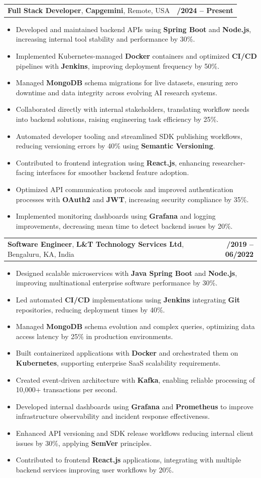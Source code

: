 \documentclass[letterpaper,11pt]{article}
\makeatletter
\newcommand{\resumeItem}[1]{
  \item\footnotesize{
    {#1 \vspace{-2pt}}
  }
}
\newcommand{\resumeSubheading}[4]{
  \vspace{-2pt}\item
    \begin{tabular*}{1.0\textwidth}[t]{l@{\extracolsep{\fill}}r}
      \textbf{\fontsize{10pt}{14pt}\selectfont #3}, \textbf{\fontsize{10pt}{14pt}\selectfont #1}, \fontsize{10pt}{14pt}\selectfont #4 & \textbf{\fontsize{10pt}{14pt}\selectfont #2} \\
    \end{tabular*}\vspace{-7pt}
}
\newcommand{\resumeItemListStart}{\begin{itemize}[leftmargin=*]}
\newcommand{\resumeItemListEnd}{\end{itemize}\vspace{-5pt}}
\makeatother
\begin{document}
    \resumeSubheading
        {Capgemini}{01/2024 -- Present}
        {Full Stack Developer}{Remote, USA}
      \resumeItemListStart
        \resumeItem{Developed and maintained backend APIs using \textbf{Spring Boot} and \textbf{Node.js}, increasing internal tool stability and performance by 30\%.}
        \resumeItem{Implemented Kubernetes-managed \textbf{Docker} containers and optimized \textbf{CI/CD} pipelines with \textbf{Jenkins}, improving deployment frequency by 50\%.}
        \resumeItem{Managed \textbf{MongoDB} schema migrations for live datasets, ensuring zero downtime and data integrity across evolving AI research systems.}
        \resumeItem{Collaborated directly with internal stakeholders, translating workflow needs into backend solutions, raising engineering task efficiency by 25\%.}
        \resumeItem{Automated developer tooling and streamlined SDK publishing workflows, reducing versioning errors by 40\% using \textbf{Semantic Versioning}.}
        \resumeItem{Contributed to frontend integration using \textbf{React.js}, enhancing researcher-facing interfaces for smoother backend feature adoption.}
        \resumeItem{Optimized API communication protocols and improved authentication processes with \textbf{OAuth2} and \textbf{JWT}, increasing security compliance by 35\%.}
        \resumeItem{Implemented monitoring dashboards using \textbf{Grafana} and logging improvements, decreasing mean time to detect backend issues by 20\%.}
      \resumeItemListEnd

    \resumeSubheading
        {L\&T Technology Services Ltd}{08/2019 -- 06/2022}
        {Software Engineer}{Bengaluru, KA, India}
      \resumeItemListStart
        \resumeItem{Designed scalable microservices with \textbf{Java Spring Boot} and \textbf{Node.js}, improving multinational enterprise software performance by 30\%.}
        \resumeItem{Led automated \textbf{CI/CD} implementations using \textbf{Jenkins} integrating \textbf{Git} repositories, reducing deployment times by 40\%.}
        \resumeItem{Managed \textbf{MongoDB} schema evolution and complex queries, optimizing data access latency by 25\% in production environments.}
        \resumeItem{Built containerized applications with \textbf{Docker} and orchestrated them on \textbf{Kubernetes}, supporting enterprise SaaS scalability requirements.}
        \resumeItem{Created event-driven architecture with \textbf{Kafka}, enabling reliable processing of 10,000+ transactions per second.}
        \resumeItem{Developed internal dashboards using \textbf{Grafana} and \textbf{Prometheus} to improve infrastructure observability and incident response effectiveness.}
        \resumeItem{Enhanced API versioning and SDK release workflows reducing internal client issues by 30\%, applying \textbf{SemVer} principles.}
        \resumeItem{Contributed to frontend \textbf{React.js} applications, integrating with multiple backend services improving user workflows by 20\%.}
      \resumeItemListEnd
\end{document}
